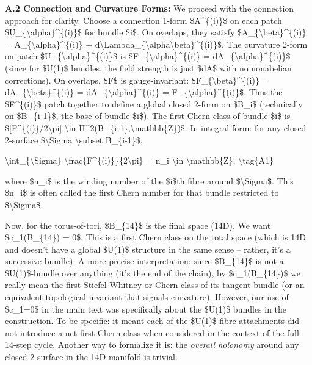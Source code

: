 \documentclass[]{article}
\begin{document}
\textbf{A.2 Connection and Curvature Forms:} We proceed with the
connection approach for clarity. Choose a connection 1-form
\$A\^{}\{(i)\}\$ on each patch
\$U\_\{\textbackslash{}alpha\}\^{}\{(i)\}\$ for bundle \$i\$. On
overlaps, they satisfy \$A\_\{\textbackslash{}beta\}\^{}\{(i)\} =
A\_\{\textbackslash{}alpha\}\^{}\{(i)\} +
d\textbackslash{}Lambda\_\{\textbackslash{}alpha\textbackslash{}beta\}\^{}\{(i)\}\$.
The curvature 2-form on patch
\$U\_\{\textbackslash{}alpha\}\^{}\{(i)\}\$ is
\$F\_\{\textbackslash{}alpha\}\^{}\{(i)\} =
dA\_\{\textbackslash{}alpha\}\^{}\{(i)\}\$ (since for \$U(1)\$ bundles,
the field strength is just \$dA\$ with no nonabelian corrections). On
overlaps, \$F\$ is gauge-invariant:
\$F\_\{\textbackslash{}beta\}\^{}\{(i)\} =
dA\_\{\textbackslash{}beta\}\^{}\{(i)\} =
dA\_\{\textbackslash{}alpha\}\^{}\{(i)\} =
F\_\{\textbackslash{}alpha\}\^{}\{(i)\}\$. Thus the \$F\^{}\{(i)\}\$
patch together to define a global closed 2-form on \$B\_i\$ (technically
on \$B\_\{i-1\}\$, the base of bundle \$i\$). The first Chern class of
bundle \$i\$ is \${[}F\^{}\{(i)\}/2\textbackslash{}pi{]}
\textbackslash{}in H\^{}2(B\_\{i-1\},\textbackslash{}mathbb\{Z\})\$. In
integral form: for any closed 2-surface \$\textbackslash{}Sigma
\textbackslash{}subset B\_\{i-1\}\$,

\textbackslash{}int\_\{\textbackslash{}Sigma\}
\textbackslash{}frac\{F\^{}\{(i)\}\}\{2\textbackslash{}pi\} = n\_i
\textbackslash{}in \textbackslash{}mathbb\{Z\},
\textbackslash{}tag\{A1\}

where \$n\_i\$ is the winding number of the \$i\$th fibre around
\$\textbackslash{}Sigma\$. This \$n\_i\$ is often called the first Chern
number for that bundle restricted to \$\textbackslash{}Sigma\$.

Now, for the torus-of-tori, \$B\_\{14\}\$ is the final space (14D). We
want \$c\_1(B\_\{14\}) = 0\$. This is a first Chern class on the total
space (which is 14D and doesn't have a global \$U(1)\$ structure in the
same sense -- rather, it's a successive bundle). A more precise
interpretation: since \$B\_\{14\}\$ is not a \$U(1)\$-bundle over
anything (it's the end of the chain), by \$c\_1(B\_\{14\})\$ we really
mean the first Stiefel-Whitney or Chern class of its tangent bundle (or
an equivalent topological invariant that signals curvature). However,
our use of \$c\_1=0\$ in the main text was specifically about the
\$U(1)\$ bundles in the construction. To be specific: it meant each of
the \$U(1)\$ fibre attachments did not introduce a net first Chern class
when considered in the context of the full 14-step cycle. Another way to
formalize it is: the \emph{overall holonomy} around any closed 2-surface
in the 14D manifold is trivial.
\end{document}
